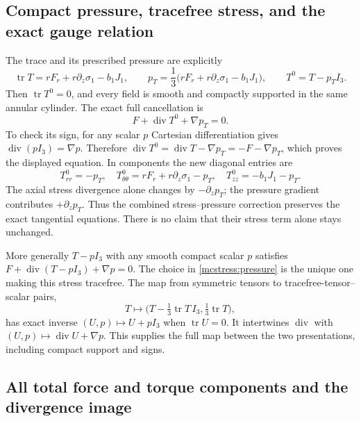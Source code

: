 \documentclass[11pt]{article}
\begin{document}
\subsection{Compact pressure, tracefree stress, and the exact gauge relation}

The trace and its prescribed pressure are explicitly
\begin{equation}\label{mcstress:pressure}
 \operatorname{tr}T=rF_r+r\partial_z\sigma_1-b_1J_1,
 \qquad
 p_T=\frac13\bigl(rF_r+r\partial_z\sigma_1-b_1J_1\bigr),
 \qquad T^0=T-p_TI_3.
\end{equation}
Then $\operatorname{tr}T^0=0$, and every field is smooth and compactly
supported in the same annular cylinder. The exact full cancellation is
\begin{equation}\label{mcstress:tracefree_cancellation}
 F+\operatorname{div}T^0+\nabla p_T=0.
\end{equation}
To check its sign, for any scalar $p$ Cartesian differentiation gives
$\operatorname{div}(pI_3)=\nabla p$. Therefore
$\operatorname{div}T^0=\operatorname{div}T-\nabla p_T
=-F-\nabla p_T$, which proves the displayed equation.
In components the new diagonal entries are
\[
 T^0_{rr}=-p_T,\quad
 T^0_{\theta\theta}=rF_r+r\partial_z\sigma_1-p_T,\quad
 T^0_{zz}=-b_1J_1-p_T.
\]
The axial stress divergence alone changes by $-\partial_zp_T$;
the pressure gradient contributes $+\partial_zp_T$. Thus the combined
stress--pressure correction preserves the exact tangential equations.
There is no claim that their stress term alone stays unchanged.

More generally $T-pI_3$ with any smooth compact scalar $p$ satisfies
$F+\operatorname{div}(T-pI_3)+\nabla p=0$.
The choice in \eqref{mcstress:pressure} is the unique one making
this stress tracefree. The map from symmetric tensors to
tracefree-tensor--scalar pairs,
\[
 T\longmapsto\bigl(T-\tfrac13\operatorname{tr}T\,I_3,
                         \tfrac13\operatorname{tr}T\bigr),
\]
has exact inverse $(U,p)\mapsto U+pI_3$ when $\operatorname{tr}U=0$.
It intertwines $\operatorname{div}$ with
$(U,p)\mapsto\operatorname{div}U+\nabla p$. This supplies the full
map between the two presentations, including compact support and signs.

\subsection{All total force and torque components and the divergence image}
\end{document}
